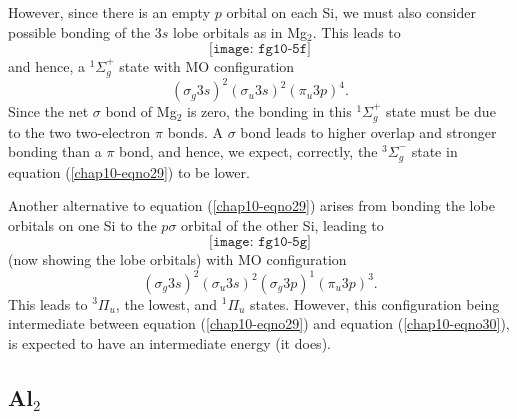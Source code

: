 However, since there is an empty $p$ orbital on each Si, we must also 
consider possible bonding of the $3s$ lobe orbitals as in Mg$_2$.
This leads to
\begin{equation}
\texttt{[image: fg10-5f]}
\end{equation}
and hence, a ${^1\Sigma}^+_g$ state with MO configuration
\begin{equation}
\left( \sigma_g 3s \right)^2 \left( \sigma_u 3s \right)^2 \left( 
\pi_u 3p \right)^4.
\label{chap10-eqno30}
\end{equation}
Since the net $\sigma$ bond of Mg$_2$ is zero, the bonding in this
${^1\Sigma}^+_g$ state must be due to the two two-electron $\pi$
bonds.  A $\sigma$ bond leads to higher overlap and stronger bonding
than a $\pi$ bond, and hence, we expect, correctly, the
${^3\Sigma}^-_g$ state in equation (\ref{chap10-eqno29}) to be lower.

Another alternative to equation (\ref{chap10-eqno29}) arises from
bonding the lobe orbitals on one Si to the $p\sigma$ orbital of the
other Si, leading to
\begin{equation}
\texttt{[image: fg10-5g]}
\end{equation}
(now showing the lobe orbitals) with MO configuration
\begin{equation}
\left( \sigma_g 3s \right)^2 \left( \sigma_u 3s \right)^2 \left( 
\sigma_g 3p \right)^1 \left( \pi_u 3p \right)^3 .
\end{equation}
This leads to ${^3\Pi}_u$, the lowest, and ${^1\Pi}_u$ states.
However, this configuration being intermediate between equation
(\ref{chap10-eqno29}) and equation (\ref{chap10-eqno30}), is expected
to have an intermediate energy (it does).

\subsection{Al$_2$}

